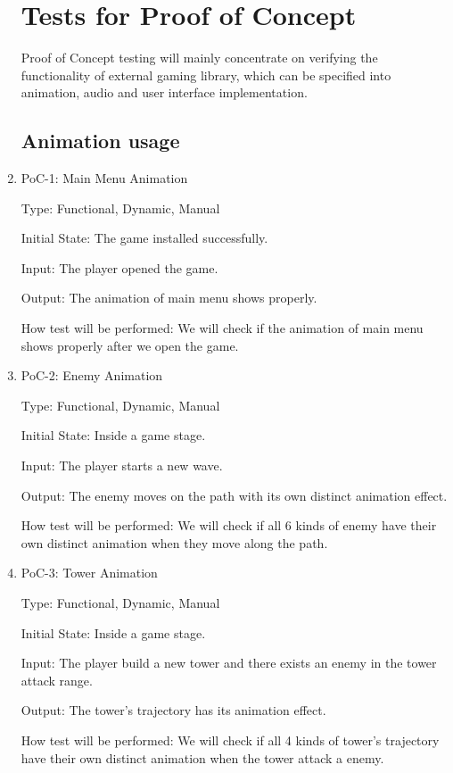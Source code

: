 \documentclass[12pt]{article}
\begin{document}
\begin{enumerate}
\section{Tests for Proof of Concept}

Proof of Concept testing will mainly concentrate on verifying the functionality of external gaming library, which can be specified into animation, audio and user interface implementation. 




\subsection{Animation usage}

	\item{PoC-1: Main Menu Animation}
					
	Type: Functional, Dynamic, Manual
					
	Initial State: The game installed successfully.
					
	Input: The player opened the game.
					
	Output: The animation of main menu shows properly.
					
	How test will be performed: We will check if the animation of main menu shows properly after we open the game.
	
	 \item{PoC-2: Enemy Animation}
    
    Type: Functional, Dynamic, Manual
    
    Initial State: Inside a game stage.
    
    Input: The player starts a new wave.
    
    Output: The enemy moves on the path with its own distinct animation effect.
    
    How test will be performed: We will check if all 6 kinds of enemy have their own distinct animation when they move along the path.
    
    \item{PoC-3: Tower Animation}
    
    Type: Functional, Dynamic, Manual
    
    Initial State: Inside a game stage.
    
    Input: The player build a new tower and there exists an enemy in the tower attack range.
    
    Output: The tower's trajectory has its animation effect.
    
    How test will be performed: We will check if all 4 kinds of tower's trajectory have their own distinct animation when the tower attack a enemy.
    

\end{enumerate}
\end{document}
